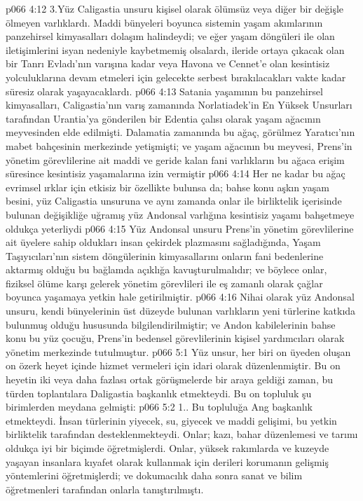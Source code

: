 \vs p066 4:12 3.\bibnobreakspace Yüz Caligastia unsuru kişisel olarak ölümsüz veya diğer bir değişle ölmeyen varlıklardı. Maddi bünyeleri boyunca sistemin yaşam akımlarının panzehirsel kimyasalları dolaşım halindeydi; ve eğer yaşam döngüleri ile olan iletişimlerini isyan nedeniyle kaybetmemiş olsalardı, ileride ortaya çıkacak olan bir Tanrı Evladı’nın varışına kadar veya Havona ve Cennet’e olan kesintisiz yolculuklarına devam etmeleri için gelecekte serbest bırakılacakları vakte kadar süresiz olarak yaşayacaklardı.
\vs p066 4:13 Satania yaşamının bu panzehirsel kimyasalları, Caligastia’nın varış zamanında Norlatiadek’in En Yüksek Unsurları tarafından Urantia’ya gönderilen bir Edentia çalısı olarak yaşam ağacının meyvesinden elde edilmişti. Dalamatia zamanında bu ağaç, görülmez Yaratıcı’nın mabet bahçesinin merkezinde yetişmişti; ve yaşam ağacının bu meyvesi, Prens’in yönetim görevlilerine ait maddi ve geride kalan fani varlıkların bu ağaca erişim süresince kesintisiz yaşamalarına izin vermiştir
\vs p066 4:14 Her ne kadar bu ağaç evrimsel ırklar için etkisiz bir özellikte bulunsa da; bahse konu aşkın yaşam besini, yüz Caligastia unsuruna ve aynı zamanda onlar ile birliktelik içerisinde bulunan değişikliğe uğramış yüz Andonsal varlığına kesintisiz yaşamı bahşetmeye oldukça yeterliydi
\vs p066 4:15 Yüz Andonsal unsuru Prens’in yönetim görevlilerine ait üyelere sahip oldukları insan çekirdek plazmasını sağladığında, Yaşam Taşıyıcıları’nın sistem döngülerinin kimyasallarını onların fani bedenlerine aktarmış olduğu bu bağlamda açıklığa kavuşturulmalıdır; ve böylece onlar, fiziksel ölüme karşı gelerek yönetim görevlileri ile eş zamanlı olarak çağlar boyunca yaşamaya yetkin hale getirilmiştir.
\vs p066 4:16 Nihai olarak yüz Andonsal unsuru, kendi bünyelerinin üst düzeyde bulunan varlıkların yeni türlerine katkıda bulunmuş olduğu hususunda bilgilendirilmiştir; ve Andon kabilelerinin bahse konu bu yüz çocuğu, Prens’in bedensel görevlilerinin kişisel yardımcıları olarak yönetim merkezinde tutulmuştur.
\vs p066 5:1 Yüz unsur, her biri on üyeden oluşan on özerk heyet içinde hizmet vermeleri için idari olarak düzenlenmiştir. Bu on heyetin iki veya daha fazlası ortak görüşmelerde bir araya geldiği zaman, bu türden toplantılara Daligastia başkanlık etmekteydi. Bu on topluluk şu birimlerden meydana gelmişti:
\vs p066 5:2 1.\bibnobreakspace {}. Bu topluluğa Ang başkanlık etmekteydi. İnsan türlerinin yiyecek, su, giyecek ve maddi gelişimi, bu yetkin birliktelik tarafından desteklenmekteydi. Onlar; kazı, bahar düzenlemesi ve tarımı oldukça iyi bir biçimde öğretmişlerdi. Onlar, yüksek rakımlarda ve kuzeyde yaşayan insanlara kıyafet olarak kullanmak için derileri korumanın gelişmiş yöntemlerini öğretmişlerdi; ve dokumacılık daha sonra sanat ve bilim öğretmenleri tarafından onlarla tanıştırılmıştı.
